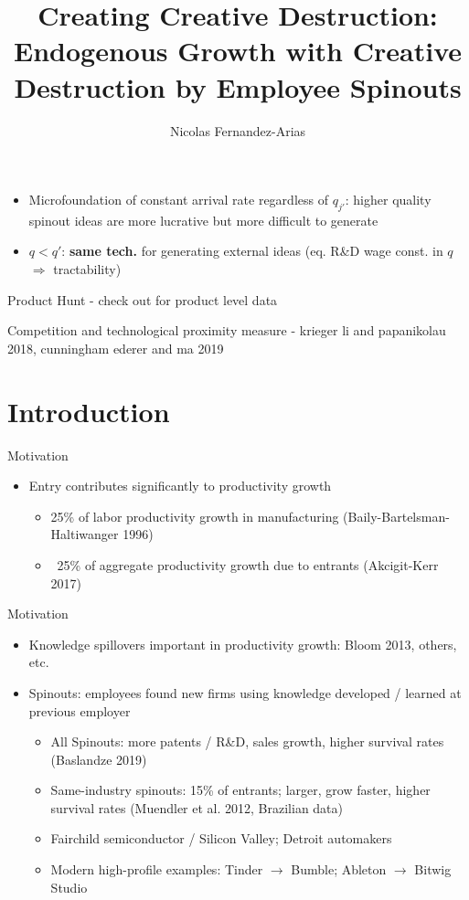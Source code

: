 \documentclass[english,usenames,dvipsnames]{beamer}
\title{Creating Creative Destruction: Endogenous Growth with Creative Destruction by Employee Spinouts}
\author{Nicolas Fernandez-Arias}
\begin{document}
	
		\begin{itemize}
		\item Microfoundation of constant arrival rate regardless of $q_{j'}$: higher quality spinout ideas are more lucrative but more difficult to generate
		\item $q < q'$: \textbf{same tech.} for generating external ideas (eq. R\&D wage const. in $q$ $\Rightarrow$ tractability)
	\end{itemize}
	
Product Hunt - check out for product level data

Competition and technological proximity measure  - krieger li and papanikolau 2018, cunningham ederer and ma 2019

\maketitle

\section{Introduction}

\begin{frame}{Motivation}
\begin{itemize}
	\item Entry contributes significantly to productivity growth
	\begin{itemize}
		\item 25\% of labor productivity growth in manufacturing (Baily-Bartelsman-Haltiwanger 1996)
		\item ~25\% of aggregate productivity growth due to entrants (Akcigit-Kerr 2017)
	\end{itemize}
\end{itemize}
\end{frame}


\begin{frame}{Motivation}
\begin{itemize}
	\item Knowledge spillovers important in productivity growth: Bloom 2013, others, etc.
	\item Spinouts: employees found new firms using knowledge developed / learned at previous employer
	\begin{itemize}
		\item All Spinouts: more patents / R\&D, sales growth, higher survival rates (Baslandze 2019) 
		\item Same-industry spinouts: 15\% of entrants; larger, grow faster, higher survival rates (Muendler et al. 2012, Brazilian data)
		\item Fairchild semiconductor / Silicon Valley; Detroit automakers
		\item Modern high-profile examples: Tinder $\rightarrow$ Bumble; Ableton $\rightarrow$ Bitwig Studio
	\end{itemize}
\end{itemize}
\end{frame}
\end{document}
